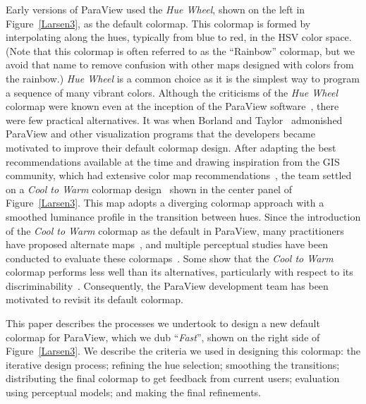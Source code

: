 \documentclass{IEEEcsmag}
\newcommand*{\colormap}[1]{\textsl{#1}\xspace}
\newcommand*{\huewheel}{\colormap{Hue Wheel}}
\newcommand*{\coolwarm}{\colormap{Cool to Warm}}
\newcommand*{\fast}{\colormap{Fast}}
\begin{document}
Early versions of ParaView used the \huewheel, shown on the left in Figure~\ref{Larsen3}, as the default colormap.
This colormap is formed by interpolating along the hues, typically from blue to red, in the HSV color space.
(Note that this colormap is often referred to as the ``Rainbow'' colormap, but we avoid that name to remove confusion with other maps designed with colors from the rainbow.)
\huewheel is a common choice as it is the simplest way to program a sequence of many vibrant colors.
Although the criticisms of the \huewheel colormap were known even at the inception of the ParaView software~\cite{Rogowitz1998}, there were few practical alternatives.
It was when Borland and Taylor~\cite{Borland2007} admonished ParaView and other visualization programs that the developers became motivated to improve their default colormap design.
After adapting the best recommendations available at the time and drawing inspiration from the GIS community, which had extensive color map recommendations~\cite{Brewer2003}, the team settled on a \coolwarm colormap design~\cite{Moreland2009} shown in the center panel of Figure~\ref{Larsen3}.
This map adopts a diverging colormap approach with a smoothed luminance profile in the transition between hues. 
Since the introduction of the \coolwarm colormap as the default in ParaView, many practitioners have proposed alternate maps~\cite{Samsel2015}, and multiple perceptual studies have been conducted to evaluate these colormaps~\cite{Ware2017}.
Some show that the \coolwarm colormap performs less well than its alternatives, particularly with respect to its discriminability~\cite{Ware2017,Ware2019}.
Consequently, the ParaView development team has been motivated to revisit its default colormap. 

This paper describes the processes we undertook to design a new default colormap for ParaView, which we dub ``\fast'', shown on the right side of Figure~\ref{Larsen3}.
We describe the criteria we used in designing this colormap: the iterative design process; refining the hue selection; smoothing the transitions; distributing the final colormap to get feedback from current users; evaluation using perceptual models; and making the final refinements.
\end{document}
